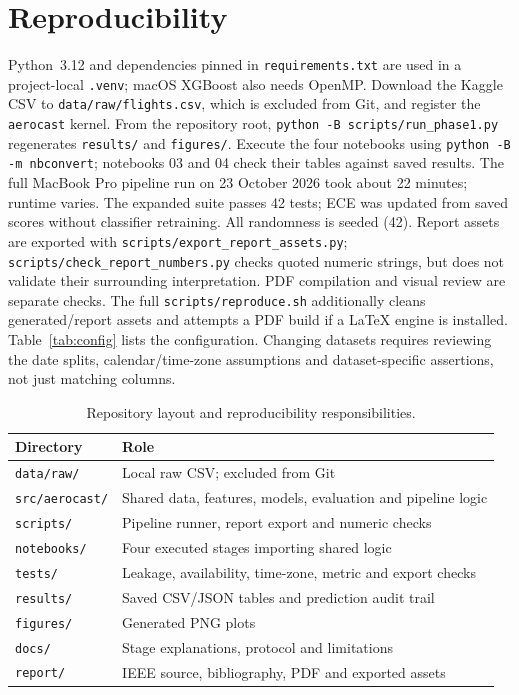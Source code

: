 \documentclass[conference]{IEEEtran}
\newcommand{\tabsize}{\footnotesize}
\begin{document}
\section*{Reproducibility}
\begingroup\raggedright
Python~3.12 and dependencies pinned in \texttt{requirements.txt} are used in a project-local \texttt{.venv}; macOS XGBoost also needs OpenMP. Download the Kaggle CSV to \texttt{data/raw/flights.csv}, which is excluded from Git, and register the \texttt{aerocast} kernel. From the repository root, \texttt{python -B scripts/run\_phase1.py} regenerates \texttt{results/} and \texttt{figures/}. Execute the four notebooks using \texttt{python -B -m nbconvert}; notebooks 03 and 04 check their tables against saved results. The full MacBook Pro pipeline run on 23 October 2026 took about 22 minutes; runtime varies. The expanded suite passes 42 tests; ECE was updated from saved scores without classifier retraining. All randomness is seeded (42). Report assets are exported with \texttt{scripts/export\_report\_assets.py}; \texttt{scripts/check\_report\_numbers.py} checks quoted numeric strings, but does not validate their surrounding interpretation. PDF compilation and visual review are separate checks. The full \texttt{scripts/reproduce.sh} additionally cleans generated/report assets and attempts a PDF build if a LaTeX engine is installed. Table~\ref{tab:config} lists the configuration. Changing datasets requires reviewing the date splits, calendar/time-zone assumptions and dataset-specific assertions, not just matching columns.

\par\endgroup

\begin{table}[t]
\caption[Repository layout.]{Repository layout and reproducibility responsibilities.}
\label{tab:layout}
\centering\tabsize
\begin{tabular}{@{}P{2.3cm}P{5.5cm}@{}}
\toprule
Directory & Role\\
\midrule
\texttt{data/raw/} & Local raw CSV; excluded from Git\\
\texttt{src/aerocast/} & Shared data, features, models, evaluation and pipeline logic\\
\texttt{scripts/} & Pipeline runner, report export and numeric checks\\
\texttt{notebooks/} & Four executed stages importing shared logic\\
\texttt{tests/} & Leakage, availability, time-zone, metric and export checks\\
\texttt{results/} & Saved CSV/JSON tables and prediction audit trail\\
\texttt{figures/} & Generated PNG plots\\
\texttt{docs/} & Stage explanations, protocol and limitations\\
\texttt{report/} & IEEE source, bibliography, PDF and exported assets\\
\bottomrule
\end{tabular}
\end{table}
\end{document}

